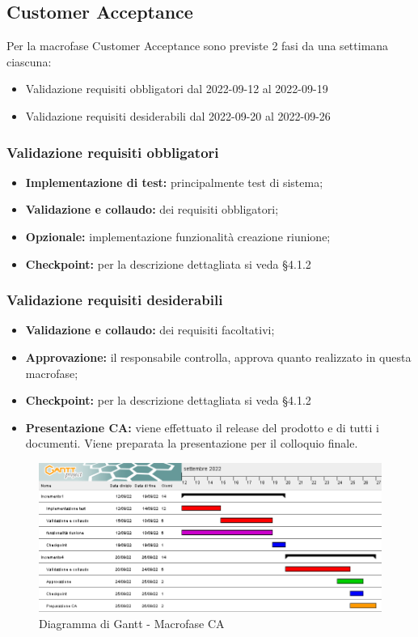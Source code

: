 \subsection{Customer Acceptance}
Per la macrofase Customer Acceptance sono previste 2 fasi da una settimana ciascuna:
\begin{itemize}
    \item Validazione requisiti obbligatori dal 2022-09-12 al 2022-09-19
    \item Validazione requisiti desiderabili dal 2022-09-20 al 2022-09-26
\end{itemize}
\subsubsection{Validazione requisiti obbligatori}
\begin{itemize}
    \item \textbf{Implementazione di test:} principalmente test di sistema;
    \item \textbf{Validazione e collaudo:} dei requisiti obbligatori;
    \item \textbf{Opzionale:} implementazione funzionalità creazione riunione;
    \item \textbf{Checkpoint:} per la descrizione dettagliata si veda §4.1.2
\end{itemize}
\subsubsection{Validazione requisiti desiderabili}
\begin{itemize}
    \item \textbf{Validazione e collaudo:} dei requisiti facoltativi;
    \item \textbf{Approvazione:} il responsabile controlla, approva quanto realizzato in questa macrofase;
    \item \textbf{Checkpoint:} per la descrizione dettagliata si veda §4.1.2
    \item \textbf{Presentazione CA:} viene effettuato il release del prodotto e di tutti i documenti. Viene preparata la presentazione per il colloquio finale.
\end{itemize}
\begin{figure}[H]
	\includegraphics[width=\linewidth]{images/CA.png}
    \caption{Diagramma di Gantt - Macrofase CA}
\end{figure}
\newpage
